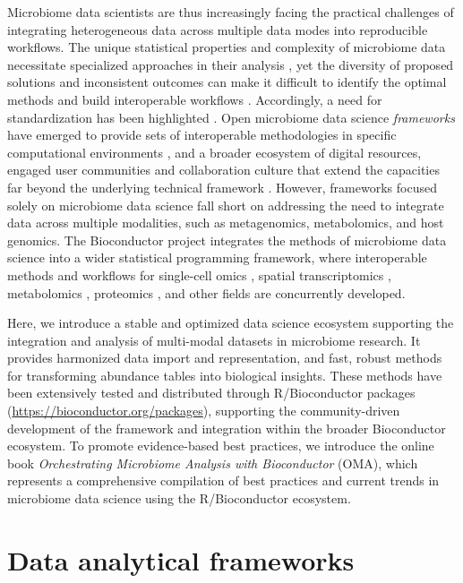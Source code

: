 \documentclass[
  sn-nature,
]{sn-jnl}
\begin{document}
Microbiome data scientists are thus increasingly facing the practical
challenges of integrating heterogeneous data across multiple data modes
into reproducible workflows. The unique statistical properties and
complexity of microbiome data necessitate specialized approaches in
their analysis \citep{moreno-indias2021, jeganathan2021, willis2019},
yet the diversity of proposed solutions and inconsistent outcomes
\citep{nearing2022, pelto2025, gamboa-tuz2025} can make it difficult to
identify the optimal methods and build interoperable workflows
\citep{wen2023, shetty2019}. Accordingly, a need for standardization has
been highlighted \citep{moreno-indias2021}. Open microbiome data science
\emph{frameworks} have emerged to provide sets of interoperable
methodologies in specific computational environments
\citep{eren2021, schloss2009, bolyen2019, mcmurdie2012}, and a broader
ecosystem of digital resources, engaged user communities and
collaboration culture that extend the capacities far beyond the
underlying technical framework \citep{katz2019}. However, frameworks
focused solely on microbiome data science fall short on addressing the
need to integrate data across multiple modalities, such as metagenomics,
metabolomics, and host genomics. The Bioconductor project integrates the
methods of microbiome data science into a wider statistical programming
framework, where interoperable methods and workflows for single-cell
omics \citep{amezquita2020}, spatial transcriptomics
\citep{crowell2025}, metabolomics \citep{gatto2025}, proteomics
\citep{gatto2025, anwar2025}, and other fields are concurrently
developed.

Here, we introduce a stable and optimized data science ecosystem
supporting the integration and analysis of multi-modal datasets in
microbiome research. It provides harmonized data import and
representation, and fast, robust methods for transforming abundance
tables into biological insights. These methods have been extensively
tested and distributed through R/Bioconductor packages
(\url{https://bioconductor.org/packages}), supporting the
community-driven development of the framework and integration within the
broader Bioconductor ecosystem. To promote evidence-based best
practices, we introduce the online book \emph{Orchestrating Microbiome
Analysis with Bioconductor} (OMA), which represents a comprehensive
compilation of best practices and current trends in microbiome data
science using the R/Bioconductor ecosystem.

\section{Data analytical frameworks}\label{sec-data_frameworks}
\end{document}
